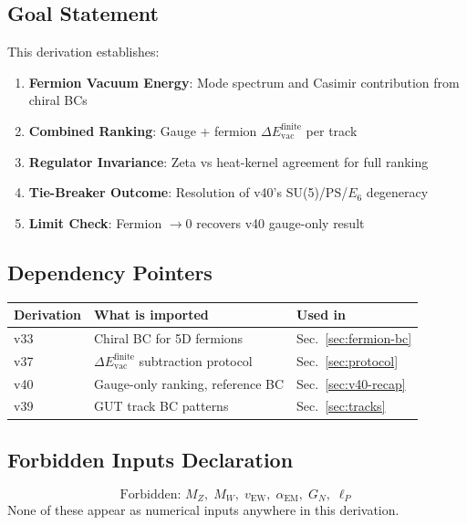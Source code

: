\documentclass[11pt,a4paper]{article}
\begin{document}
\subsection{Goal Statement}
This derivation establishes:
\begin{enumerate}
    \item \textbf{Fermion Vacuum Energy}: Mode spectrum and Casimir contribution from chiral BCs
    \item \textbf{Combined Ranking}: Gauge + fermion $\Delta E_{\text{vac}}^{\text{finite}}$ per track
    \item \textbf{Regulator Invariance}: Zeta vs heat-kernel agreement for full ranking
    \item \textbf{Tie-Breaker Outcome}: Resolution of v40's SU(5)/PS/$E_6$ degeneracy
    \item \textbf{Limit Check}: Fermion $\to 0$ recovers v40 gauge-only result
\end{enumerate}

\subsection{Dependency Pointers}
\begin{center}
\begin{tabular}{lll}
\toprule
Derivation & What is imported & Used in \\
\midrule
v33 & Chiral BC for 5D fermions & Sec.~\ref{sec:fermion-bc} \\
v37 & $\Delta E_{\text{vac}}^{\text{finite}}$ subtraction protocol & Sec.~\ref{sec:protocol} \\
v40 & Gauge-only ranking, reference BC & Sec.~\ref{sec:v40-recap} \\
v39 & GUT track BC patterns & Sec.~\ref{sec:tracks} \\
\bottomrule
\end{tabular}
\end{center}

\subsection{Forbidden Inputs Declaration}
\begin{equation}
\label{eq:forbidden}
\boxed{\text{Forbidden: } M_Z,\; M_W,\; v_{\text{EW}},\; \alpha_{\text{EM}},\; G_N,\; \ell_P}
\end{equation}
None of these appear as numerical inputs anywhere in this derivation.

\end{document}
